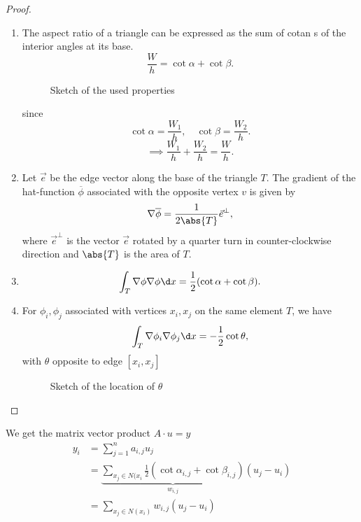 \begin{proof}
\label{thm:stiffnessmatrixlemmaproof}
\begin{enumerate}[label=\arabic{enumi})]
	\item The aspect ratio of a triangle can be expressed as the sum of cotan s of the interior angles at its base.
		\[
		\frac{W}{h} = \cot \alpha + \cot \beta
		.\] 
		\begin{figure}[ht!]
			\begin{center}
				
			\end{center}
			\caption{Sketch of the used properties}
			\label{fig:triangleexplained}
		\end{figure}
		
		since
		\[
			\cot \alpha = \frac{W_{1}}{h},\quad \cot \beta = \frac{W_2}{h}
		.\] 
		\[
		\implies \frac{W_1}{h} + \frac{W_2}{h} = \frac{W}{h}
		.\] 
	\item Let $\vec{e}$ be the edge vector along the base of the triangle $T$. The gradient of the hat-function $\overline{\phi }$ associated with the opposite vertex $v$ is given by
		\[
		\nabla \overline{\phi } = \frac{1}{2\abs{T} }\vec{e}^{\bot}
		,\] 
		where $\vec{e}^{\bot}$ is the vector $\vec{e}$ rotated by a quarter turn in counter-clockwise direction and $\abs{T} $ is the area of $T$.
	\item 
		\[
			\int_{T}\nabla \phi \nabla \phi \d x = \frac{1}{2}(\cot \alpha + \cot \beta)
		.\] 
	\item For $\phi _{i}, \phi _{j}$ associated with vertices $x_{i}, x_{j}$ on the same element $T$, we have
		\[
		\int_{T}\nabla  \phi _{i} \nabla \phi _{j} \d x = - \frac{1}{2}\cot \theta
		,\] 
		with $\theta$ opposite to edge $[x_{i}, x_{j}]$
		\begin{figure}[ht!]
			\begin{center}
				
			\end{center}
			\caption{Sketch of the location of $\theta$}
			\label{fig:thetasketch}
		\end{figure}
		
\end{enumerate}
\end{proof}

\begin{remark}
\label{thm:stiffnessmatrixlemmaremark}
	We get the matrix vector product $A\cdot u = y$
	\begin{align*}
		y_{i} &= \sum_{j=1}^{n}{a_{i,j}u_{j}}\\
			  &= \underbrace{\sum_{x_{j}\in N(x_{i}}^{}{\frac{1}{2}(\cot \alpha_{i,j}+ \cot \beta_{i,j})}}_{w_{i,j}}(u_{j}-u_{i}) \\
			  &= \sum_{x_{j}\in N(x_{i})}^{}{w_{i,j}(u_{j}- u_{i})}
	\end{align*}
\end{remark}

